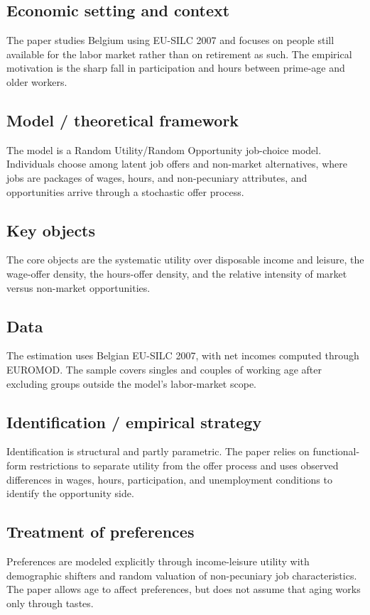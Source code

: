 \documentclass[11pt,a4paper]{article}
\begin{document}
\subsection*{Economic setting and context}
The paper studies Belgium using EU-SILC 2007 and focuses on people still available for the labor market rather than on retirement as such. The empirical motivation is the sharp fall in participation and hours between prime-age and older workers.

\subsection*{Model / theoretical framework}
The model is a Random Utility/Random Opportunity job-choice model. Individuals choose among latent job offers and non-market alternatives, where jobs are packages of wages, hours, and non-pecuniary attributes, and opportunities arrive through a stochastic offer process.

\subsection*{Key objects}
The core objects are the systematic utility over disposable income and leisure, the wage-offer density, the hours-offer density, and the relative intensity of market versus non-market opportunities.

\subsection*{Data}
The estimation uses Belgian EU-SILC 2007, with net incomes computed through EUROMOD. The sample covers singles and couples of working age after excluding groups outside the model’s labor-market scope.

\subsection*{Identification / empirical strategy}
Identification is structural and partly parametric. The paper relies on functional-form restrictions to separate utility from the offer process and uses observed differences in wages, hours, participation, and unemployment conditions to identify the opportunity side.

\subsection*{Treatment of preferences}
Preferences are modeled explicitly through income-leisure utility with demographic shifters and random valuation of non-pecuniary job characteristics. The paper allows age to affect preferences, but does not assume that aging works only through tastes.
\end{document}

